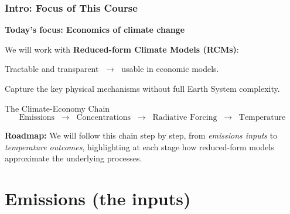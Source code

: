 \documentclass[xcolor=x11names,compress,aspectratio=169]{beamer}%
\makeatletter
\renewenvironment{itemize}{\begin{compactitemize}[<+-| alert@+>]}{\end{compactitemize}}
\makeatother
\begin{document}
\begin{frame}%
%

\frametitle{Intro: Focus of This Course}%


\textbf{Today's focus: Economics of climate change}

\begin{itemize}
\item We will work with \textbf{Reduced-form Climate Models (RCMs)}:

\begin{itemize}
\item Tractable and transparent $\;\rightarrow\;$ usable in economic models.

\item Capture the key physical mechanisms without full Earth System
complexity.\vspace{3ex}
\end{itemize}
\end{itemize}

\vspace{0.4cm} \begin{block}{The Climate-Economy Chain}
\[
\text{Emissions} \;\;\rightarrow\;\; \text{Concentrations} \;\;\rightarrow\;\;
\text{Radiative Forcing} \;\;\rightarrow\;\; \text{Temperature}
\]
\end{block}\textbf{Roadmap:} We will follow this chain step by step, from
\emph{emissions inputs} to \emph{temperature outcomes}, highlighting at each
stage how reduced-form models approximate the underlying processes.%

\transboxout
\end{frame}%


\section{Emissions (the inputs)}

%
\end{document}
